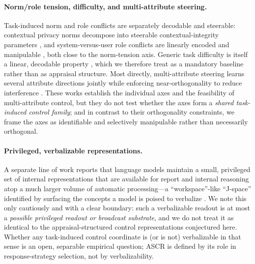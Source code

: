 \documentclass[11pt]{article}
\newcommand{\ascr}{ASCR}
\begin{document}
\paragraph{Norm/role tension, difficulty, and multi-attribute steering.}
Task-induced norm and role conflicts are separately decodable and steerable:
contextual privacy norms decompose into steerable contextual-integrity parameters
\citep{wang2026privacy}, and system-versus-user role conflicts are linearly encoded
and manipulable \citep{zeng2025roleconflict}, both close to the norm-tension axis.
Generic task difficulty is itself a linear, decodable property
\citep{lee2025difficulty}, which we therefore treat as a mandatory baseline rather
than as appraisal structure. Most directly, multi-attribute steering learns several
attribute directions jointly while enforcing near-orthogonality to reduce
interference \citep{nguyen2025matsteer}. These works establish the individual axes
and the feasibility of multi-attribute control, but they do not test whether the
axes form a \emph{shared task-induced control family}; and in contrast to their
orthogonality constraints, we frame the axes as identifiable and selectively
manipulable rather than necessarily orthogonal.

\paragraph{Privileged, verbalizable representations.}
A separate line of work reports that language models maintain a small, privileged
set of internal representations that are available for report and internal
reasoning atop a much larger volume of automatic processing---a
``workspace''-like ``J-space'' identified by surfacing the concepts a model is
poised to verbalize \citep{gurnee2026workspace}. We note this only cautiously and
with a clear boundary: such a verbalizable readout is at most a \emph{possible
privileged readout or broadcast substrate}, and we do not treat it as identical to
the appraisal-structured control representations conjectured here. Whether any
task-induced control coordinate is (or is not) verbalizable in that sense is an
open, separable empirical question; \ascr{} is defined by its role in
response-strategy selection, not by verbalizability.
\end{document}

